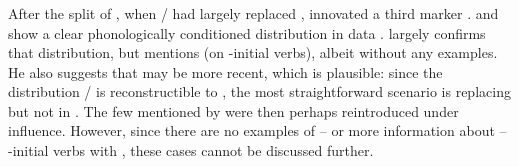 %


\subsubsection{\akuriyo {}}
\label{sec:akuriyo}
After the split of \PTir, when \slash{} had largely replaced , \akuriyo innovated a third  marker .
 and  show a clear phonologically conditioned distribution in  \akuriyo data .
\textcite[107]{meira1998proto} largely confirms that distribution, but mentions  (on -initial verbs), albeit without any examples.
He also suggests that  may be more recent, which is plausible: since the distribution  /  is reconstructible to \PTir, the most straightforward scenario is  replacing  but not  in \akuriyo.
The few  mentioned by \textcite{meira1998proto} were then perhaps reintroduced under \trio influence.
However, since there are no examples of -- or more information about -- -initial verbs with , these cases cannot be discussed further.

